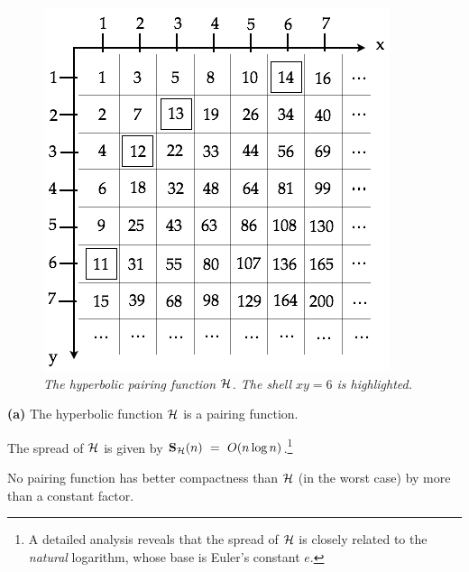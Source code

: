 \begin{figure}[htb]
\begin{center}
      \includegraphics[scale=0.4]{FiguresArithmetic/PairingHyper}
\end{center}
\caption{{\it The hyperbolic pairing function $\mbox{$\cal H$}$.  The shell $xy = 6$ is highlighted.}
\label{fig:pairingHyper}}
\end{figure}


\begin{prop}%
\label{thm:hyp-opt}
{\bf (a)}
The hyperbolic function $\mbox{$\cal H$}$ is a pairing function.

\smallskip

The spread of $\mbox{$\cal H$}$ is given by
${\bf S}_{\cal H}(n) \ = \ O(n \log n)$.\footnote{A  detailed analysis reveals that the spread of $\cal H$ is closely related to the {\em natural} logarithm, whose base is Euler's constant $e$.}

\smallskip

No pairing function has better compactness than $\mbox{$\cal H$}$ (in the worst case) by more than a constant factor.
\end{prop}

